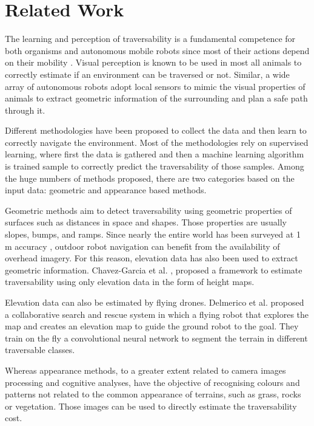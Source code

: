 \documentclass[../document.tex]{subfiles}
\begin{document}
\chapter{Related Work}
The learning and perception of traversability is
a fundamental competence for both organisms and autonomous mobile robots since most of their
actions depend on their mobility \cite{ugur2010traversability}. 
Visual perception is known to be used in most all animals to correctly estimate if an environment can be traversed or not.
Similar, a wide array of autonomous robots adopt local sensors to mimic the visual properties of animals to extract geometric information of the surrounding and plan a safe path through it. 

Different methodologies have been proposed to collect the data and then learn to correctly navigate the environment.
Most of the methodologies rely on supervised learning, where first the data is gathered and then a machine learning algorithm is trained sample to correctly predict the traversability of those samples.
Among the huge numbers of methods proposed, there are two categories based on the input data: geometric and appearance based methods. 

Geometric methods aim to detect traversability using geometric properties of surfaces such as distances in space and shapes. Those properties are usually slopes, bumps, and ramps. Since nearly the entire world has been surveyed at 1 m accuracy \cite{sofman2006improving}, 
outdoor robot navigation can benefit from the availability of overhead imagery. For this reason, elevation data has also been used to extract geometric information. Chavez-Garcia et al. \cite{omar2018traversability}, proposed a framework to estimate traversability using only elevation data in the form of height maps. 

Elevation data can also be estimated by flying drones. Delmerico et al. \cite{delmerico2016active} proposed a collaborative search and rescue system in which a flying robot that explores the map and creates an elevation map to guide the ground robot to the goal. They train on the fly a convolutional neural network to segment the terrain in different traversable classes.  

Whereas appearance methods, to a greater extent related to camera images processing and cognitive analyses, have the objective of recognising colours and patterns not related to the common appearance of terrains, such as grass, rocks or vegetation. Those images can be used to directly estimate the traversability cost. 
\end{document}
